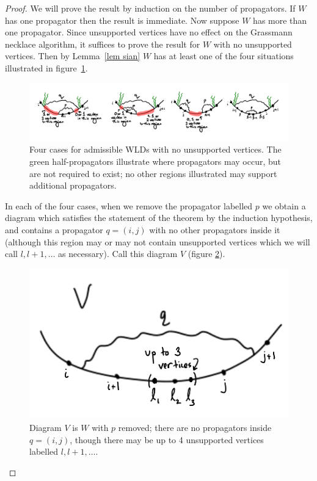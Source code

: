 \documentclass[11pt]{article}
\theoremstyle{remark}
\theoremstyle{definition}
\begin{document}
\begin{proof}
    We will prove the result by induction on the number of propagators.  If $W$ has one propagator then the result is immediate.  Now suppose $W$ has more than one propagator.  Since unsupported vertices have no effect on the Grassmann necklace algorithm, it suffices to prove the result for $W$ with no unsupported vertices.  Then by Lemma~\ref{lem sian} $W$ has at least one of the four situations illustrated in figure~\ref{fig 3 cases}.



  \begin{figure}
    \includegraphics[scale=0.8]{3cases}
    \caption{Four cases for admissible WLDs with no unsupported vertices. The green half-propagators illustrate where propagators may occur, but are not required to exist; no other regions illustrated may support additional propagators.}\label{fig 3 cases}
  \end{figure}


In each of the four cases, when we remove the propagator labelled $p$ we obtain a diagram which satisfies the statement of the theorem by the induction hypothesis, and contains a propagator $q = (i,j)$ with no other propagators inside it (although this region may or may not contain unsupported vertices which we will call $l, l+1, \ldots$ as necessary). Call this diagram $V$ (figure \ref{fig V diagram}). 


\begin{figure}
\includegraphics[scale=0.8]{Vdiagram_modified}
\caption{Diagram $V$ is $W$ with $p$ removed; there are no propagators inside $q = (i,j)$, though there may be up to 4 unsupported vertices labelled $l, l+1, \ldots$.}
\label{fig V diagram}
\end{figure}



\end{proof}
\end{document}
